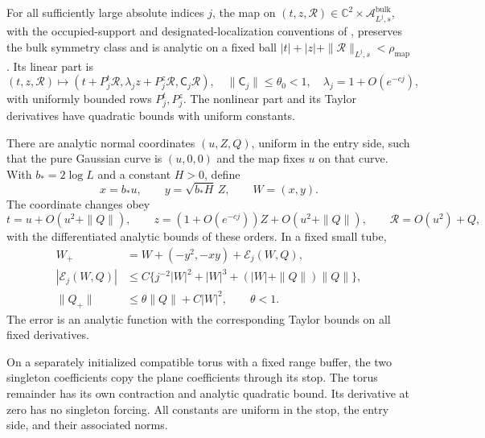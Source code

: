\begin{proposition}\label{prop:map}
For all sufficiently large absolute indices $j$, the map on
$(t,z,\mathcal R)\in\mathbb C^2\times
\mathscr A^{\mathrm{bulk}}_{L^j,s}$, with the occupied-support and
designated-localization conventions of \cite[Proposition~4.1]{F},
preserves the bulk symmetry class and is analytic on a fixed ball
$|t|+|z|+\|\mathcal R\|_{L^j,s}<\rho_{\mathrm{map}}$.
Its linear part is
\begin{equation}\label{eq:map-triangular}
 (t,z,\mathcal R)\longmapsto
   (t+P_j^t\mathcal R,\lambda_jz+P_j^z\mathcal R,
                                                \mathsf C_j\mathcal R),
 \quad \|\mathsf C_j\|\le\theta_0<1,
 \quad \lambda_j=1+O(e^{-cj}),
\end{equation}
with uniformly bounded rows $P_j^t,P_j^z$.  The nonlinear part and its
Taylor derivatives have quadratic bounds with uniform constants.

There are analytic normal coordinates $(u,Z,Q)$, uniform in the entry
side, such that the pure Gaussian curve is $(u,0,0)$ and the map fixes
$u$ on that curve.  With $b_*=2\log L$ and a constant $H>0$, define
\begin{equation}\label{eq:balanced-coordinates}
                  x=b_*u,\qquad y=\sqrt{b_*H}\,Z,\qquad W=(x,y).
\end{equation}
The coordinate changes obey
\begin{equation}\label{eq:coordinate-comparison}
 t=u+O(u^2+\|Q\|),\qquad
 z=(1+O(e^{-cj}))Z+O(u^2+\|Q\|),\qquad
 \mathcal R=O(u^2)+Q,
\end{equation}
with the differentiated analytic bounds of these orders.  In a fixed
small tube,
\begin{equation}\label{eq:normal-map}
 \begin{split}
 W_+&=W+(-y^2,-xy)+\mathcal E_j(W,Q),\\
 |\mathcal E_j(W,Q)|
 &\le C\{j^{-2}|W|^2+|W|^3+(|W|+\|Q\|)\|Q\|\},\\
 \|Q_+\|&\le\theta\|Q\|+C|W|^2,\qquad \theta<1.
 \end{split}
\end{equation}
The error is an analytic function with the corresponding Taylor
bounds on all fixed derivatives.

On a separately initialized compatible torus with a fixed range buffer,
the two singleton coefficients copy the plane coefficients through its
stop.  The torus remainder has its own contraction and analytic
quadratic bound.  Its derivative at zero has no singleton forcing.
All constants are uniform in the stop, the entry side, and their
associated norms.
\end{proposition}

